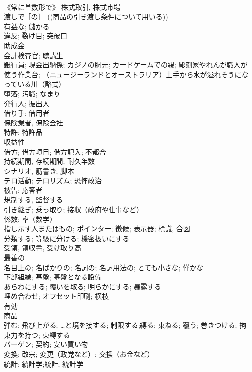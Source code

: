 \documentclass[8pt]{extreport}
\begin{document}
\begin{CJK}{UTF8}{min}
\\	《常に単数形で》 株式取引, 株式市場	
\\	渡しで［の］ ((商品の引き渡し条件について用いる))	
\\	有益な; 儲かる	
\\	違反; 裂け目; 突破口	
\\	助成金	
\\	会計検査官; 聴講生	
\\	銀行員; 現金出納係; カジノの胴元; カードゲームでの親; 彫刻家やれんが職人が使う作業台; （ニュージーランドとオーストラリア）土手から水が溢れそうになっている川（略式）	
\\	堕落; 汚職; なまり	
\\	発行人; 振出人	
\\	借り手; 借用者	
\\	保険業者, 保険会社	
\\	特許; 特許品	
\\	収益性	
\\	借方; 借方項目; 借方記入; 不都合	
\\	持続期間, 存続期間; 耐久年数	
\\	シナリオ, 筋書き; 脚本
\\	テロ活動; テロリズム; 恐怖政治	
\\	被告; 応答者	
\\	規制する, 監督する	
\\	引き継ぎ; 乗っ取り; 接収（政府や仕事など）	
\\	係数; 率（数学）	
\\	指し示す人またはもの; ポインター; 徴候; 表示器; 標識, 合図	
\\	分類する; 等級に分ける; 機密扱いにする	
\\	受領; 領収書; 受け取り高	
\\	最善の	
\\	名目上の; 名ばかりの; 名詞の; 名詞用法の; とても小さな; 僅かな	
\\	下部組織; 基盤; 基盤となる設備	
\\	あらわにする; 覆いを取る; 明らかにする; 暴露する	
\\	埋め合わせ; オフセット印刷; 横枝	
\\	有効	
\\	商品	
\\	弾む; 飛び上がる; …と境を接する; 制限する;縛る; 束ねる; 覆う; 巻きつける; 拘束力を持つ; 束縛する	
\\	バーゲン; 契約; 安い買い物	
\\	変換; 改宗; 変更（政党など）; 交換（お金など）	
\\	統計; 統計学;統計; 統計学	

\end{CJK}
\end{document}
